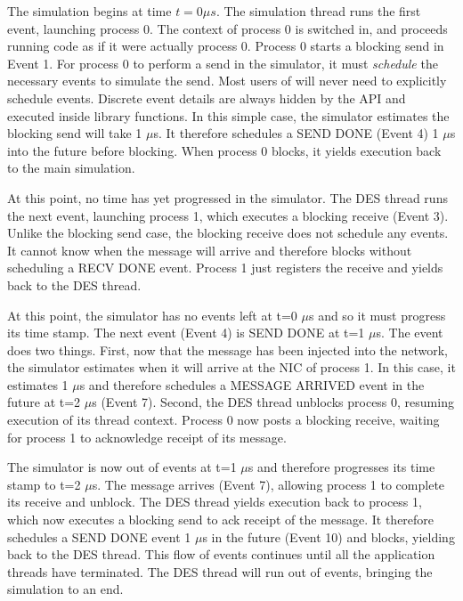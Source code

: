 The simulation begins at time $t=0\mu s$.  
The simulation thread runs the first event, launching process 0.
The context of process 0 is switched in, and \sstmacro proceeds running code as if it were actually process 0.
Process 0 starts a blocking send in Event 1.
For process 0 to perform a send in the simulator, it must \emph{schedule} the necessary events to simulate the send.
Most users of \sstmacro will never need to explicitly schedule events.
Discrete event details are always hidden by the API and executed inside library functions.
In this simple case, the simulator estimates the blocking send will take 1 $\mu$s.
It therefore schedules a SEND DONE (Event 4) 1 $\mu$s into the future before blocking.
When process 0 blocks, it yields execution back to the main simulation.

At this point, no time has yet progressed in the simulator.
The DES thread runs the next event, launching process 1, which executes a blocking receive (Event 3).
Unlike the blocking send case, the blocking receive does not schedule any events.
It cannot know when the message will arrive and therefore blocks without scheduling a RECV DONE event.
Process 1 just registers the receive and yields back to the DES thread.

At this point, the simulator has no events left at t=0 $\mu$s and so it must progress its time stamp.
The next event (Event 4) is SEND DONE at t=1 $\mu$s. The event does two things.
First, now that the message has been injected into the network, the simulator estimates when it will arrive at the NIC of process 1.
In this case, it estimates 1 $\mu$s and therefore schedules a MESSAGE ARRIVED event in the future at t=2 $\mu$s (Event 7).
Second, the DES thread unblocks process 0, resuming execution of its thread context.
Process 0 now posts a blocking receive, waiting for process 1 to acknowledge receipt of its message.

The simulator is now out of events at t=1 $\mu$s and therefore progresses its time stamp to t=2 $\mu$s.
The message arrives (Event 7), allowing process 1 to complete its receive and unblock.
The DES thread yields execution back to process 1, which now executes a blocking send to ack receipt of the message.
It therefore schedules a SEND DONE event 1 $\mu$s in the future (Event 10) and blocks, yielding back to the DES thread.
This flow of events continues until all the application threads have terminated.
The DES thread will run out of events, bringing the simulation to an end. 


